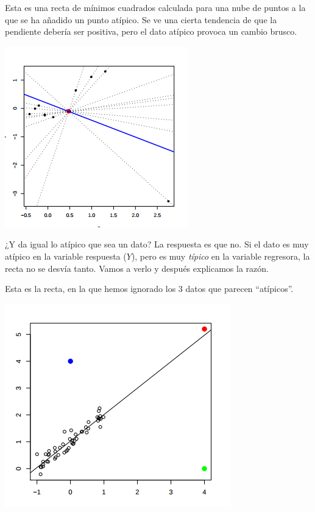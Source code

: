 \begin{itemize}
\begin{example}
Esta es una recta de mínimos cuadrados calculada para una nube de puntos a la que se ha añadido un punto atípico. Se ve una cierta tendencia de que la pendiente debería ser positiva, pero el dato atípico provoca un cambio brusco.
\begin{center}
\includegraphics[scale=0.9]{img/rmc_atipico2.png}
\end{center}

\end{example}

\begin{example}

¿Y da igual lo atípico que sea un dato? La respuesta es que no. Si el dato es muy atípico en la variable respuesta ($Y$), pero es muy \textit{típico} en la variable regresora, la recta no se desvía tanto. Vamos a verlo y después explicamos la razón.

Esta es la recta, en la que hemos ignorado los 3 datos que parecen ``atípicos''.
\begin{center}
\includegraphics[scale=0.9]{img/sobredistanciahorizontal.png}
\end{center}


\end{example}
\end{itemize}
